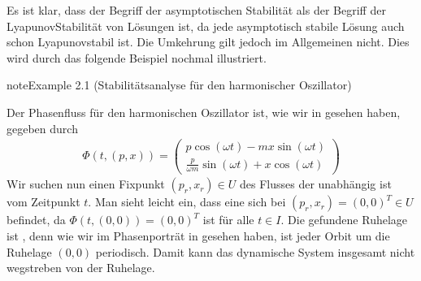 \documentclass[letterpaper,10pt,english]{jupyterBook}
\begin{document}
\sphinxAtStartPar
Es ist klar, dass der Begriff der asymptotischen Stabilität  als der Begriff der Lyapunov\sphinxhyphen{}Stabilität von Lösungen ist, da jede asymptotisch stabile Lösung auch schon Lyapunov\sphinxhyphen{}stabil ist.
Die Umkehrung gilt jedoch im Allgemeinen nicht.
Dies wird durch das folgende Beispiel nochmal illustriert.
\label{ode_stability/stabilitaetsbegriffe:example-1}
\begin{sphinxadmonition}{note}{Example 2.1 (Stabilitätsanalyse für den harmonischer Oszillator)}



\sphinxAtStartPar
Der Phasenfluss für den harmonischen Oszillator ist, wie wir in {\hyperref[\detokenize{ode/fluesse:ex:oscillations}]{}} gesehen haben, gegeben durch
\begin{equation*}
\begin{split}\Phi(t, (p,x)) = \begin{pmatrix}
p \cos(\omega t) - m x \sin(\omega t)\\
\frac{p}{\omega m}\sin(\omega t) + x\cos(\omega t)
\end{pmatrix}\end{split}
\end{equation*}
\sphinxAtStartPar
Wir suchen nun einen Fixpunkt \((p_r,x_r) \in U\) des Flusses der unabhängig ist vom Zeitpunkt \(t\).
Man sieht leicht ein, dass eine  sich bei \((p_r,x_r) = (0,0)^T \in U\) befindet, da \(\Phi(t,(0,0)) = (0,0)^T\) ist für alle \(t \in I\).
Die gefundene Ruhelage ist , denn wie wir im Phasenporträt in  gesehen haben, ist jeder Orbit um die Ruhelage \((0,0)\) periodisch. Damit kann das dynamische System insgesamt nicht wegstreben von der Ruhelage.


\end{sphinxadmonition}
\end{document}
